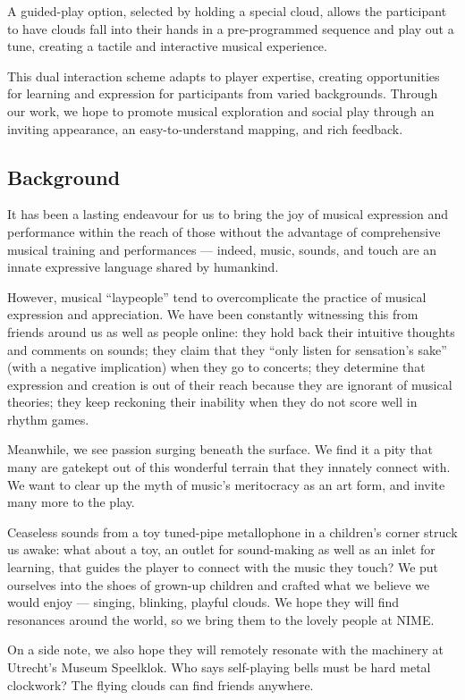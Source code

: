 \documentclass{nimemusic}
\begin{document}
A guided-play option, selected by holding a special cloud, allows the participant to have clouds fall into their hands in a pre-programmed sequence and play out a tune, creating a tactile and interactive musical experience.

This dual interaction scheme adapts to player expertise, creating opportunities for learning and expression for participants from varied backgrounds. Through our work, we hope to promote musical exploration and social play through an inviting appearance, an easy-to-understand mapping, and rich feedback.

\subsection{Background}
It has been a lasting endeavour for us to bring the joy of musical expression and performance within the reach of those without the advantage of comprehensive musical training and performances --- indeed, music, sounds, and touch are an innate expressive language shared by humankind.

However, musical ``laypeople'' tend to overcomplicate the practice of musical expression and appreciation. We have been constantly witnessing this from friends around us as well as people online: they hold back their intuitive thoughts and comments on sounds; they claim that they ``only listen for sensation's sake'' (with a negative implication) when they go to concerts; they determine that expression and creation is out of their reach because they are ignorant of musical theories; they keep reckoning their inability when they do not score well in rhythm games.

Meanwhile, we see passion surging beneath the surface. We find it a pity that many are gatekept out of this wonderful terrain that they innately connect with. We want to clear up the myth of music's meritocracy as an art form, and invite many more to the play.

Ceaseless sounds from a toy tuned-pipe metallophone in a children's corner struck us awake: what about a toy, an outlet for sound-making as well as an inlet for learning, that guides the player to connect with the music they touch? We put ourselves into the shoes of grown-up children and crafted what we believe we would enjoy --- singing, blinking, playful clouds. We hope they will find resonances around the world, so we bring them to the lovely people at NIME.

On a side note, we also hope they will remotely resonate with the machinery at Utrecht's Museum Speelklok. Who says self-playing bells must be hard metal clockwork? The flying clouds can find friends anywhere.
\end{document}
